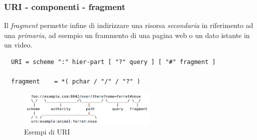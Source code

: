 \documentclass[8pt]{beamer}
\begin{document}
\begin{frame}[fragile]
	\frametitle{URI - componenti - fragment}
	
	Il \emph{fragment} permette infine di indirizzare una risorsa
	\emph{secondaria} in riferimento ad una \emph{primaria}, ad esempio un
	frammento di una pagina web o un dato istante in un video.
	
	\begin{verbatim}
  URI = scheme ":" hier-part [ "?" query ] [ "#" fragment ]

  fragment    = *( pchar / "/" / "?" )
	\end{verbatim}
	
	\vspace{\baselineskip}
	
	\begin{figure}
	    \includegraphics[width=250px]{imgs/uri-pieces.png}
	    \caption{Esempi di URI}
	\end{figure}
	
\end{frame}




\end{document}
